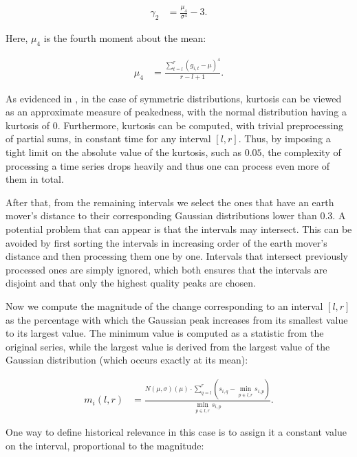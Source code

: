 \begin{align}
\label{eq:kurtosis}
\gamma_2 &= \frac{\mu_4}{\sigma^4} - 3.
\end{align}

Here, $\mu_4$ is the fourth moment about the mean:

\begin{align}
\label{eq:4th-moment}
\mu_4 &= \frac{\sum_{t=l}^{r} \left( g_{i, t} - \mu \right)^4}{r - l + 1}.
\end{align}

As evidenced in \cite{balanda88kurtosis}, in the case of symmetric distributions, kurtosis can be viewed as an approximate measure of peakedness, with the normal distribution having a kurtosis of 0. Furthermore, kurtosis can be computed, with trivial preprocessing of partial sums, in constant time for any interval $\left[ l, r \right]$. Thus, by imposing a tight limit on the absolute value of the kurtosis, such as $0.05$, the complexity of processing a time series drops heavily and thus one can process even more of them in total.

After that, from the remaining intervals we select the ones that have an earth mover's distance to their corresponding Gaussian distributions lower than $0.3$. A potential problem that can appear is that the intervals may intersect. This can be avoided by first sorting the intervals in increasing order of the earth mover's distance and then processing them one by one. Intervals that intersect previously processed ones are simply ignored, which both ensures that the intervals are disjoint and that only the highest quality peaks are chosen.

Now we compute the magnitude of the change corresponding to an interval $\left[ l, r \right]$ as the percentage with which the Gaussian peak increases from its smallest value to its largest value. The minimum value is computed as a statistic from the original series, while the largest value is derived from the largest value of the Gaussian distribution (which occurs exactly at its mean):

\begin{align}
\label{eq:gaussian-magnitude}
m_i \left( l, r \right) &= \frac{N \left( \mu, \sigma \right) \left( \mu \right) \cdot \sum_{q = l}^{r} \left( s_{i, q} - \min_{p \in \overline{l, r}} s_{i, p} \right)}{\min_{p \in \overline{l, r}} s_{i, p}}.
\end{align}

One way to define historical relevance in this case is to assign it a constant value on the interval, proportional to the magnitude:

